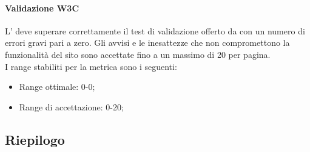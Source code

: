 			\paragraph[Validazione W3C]{\hypertarget{vw}{Validazione W3C}}
			L' deve superare correttamente il test di validazione offerto da  con un numero di errori gravi pari a zero. Gli avvisi e le inesattezze che non compromettono la funzionalità del sito sono accettate fino a un massimo di 20 per pagina.
			\\I range stabiliti per la metrica sono i seguenti:
			\begin{itemize}
				\item Range ottimale: 0-0;
				\item Range di accettazione: 0-20;
			\end{itemize}
	\subsection{Riepilogo}
